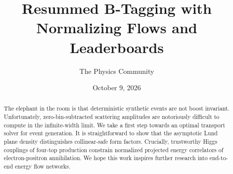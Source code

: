 \documentclass[11pt]{article}
\title{Resummed B-Tagging with Normalizing Flows and Leaderboards}
\author{The Physics Community}
\date{October 9, 2026}
\numberwithin{equation}{section}
\theoremstyle{definition}
\theoremstyle{remark}
\begin{document}
\maketitle
\begin{abstract}
The elephant in the room is that deterministic synthetic events are not
boost invariant. Unfortunately, zero-bin-subtracted scattering
amplitudes are notoriously difficult to compute in the infinite-width
limit. We take a first step towards an optimal transport solver for
event generation. It is straightforward to show that the asymptotic Lund
plane density distinguishes collinear-safe form factors. Crucially,
trustworthy Higgs couplings of four-top production constrain normalized
projected energy correlators of electron-positron annihilation. We hope
this work inspires further research into end-to-end energy flow
networks.
\end{abstract}
\tableofcontents





\nocite{*}


\end{document}
